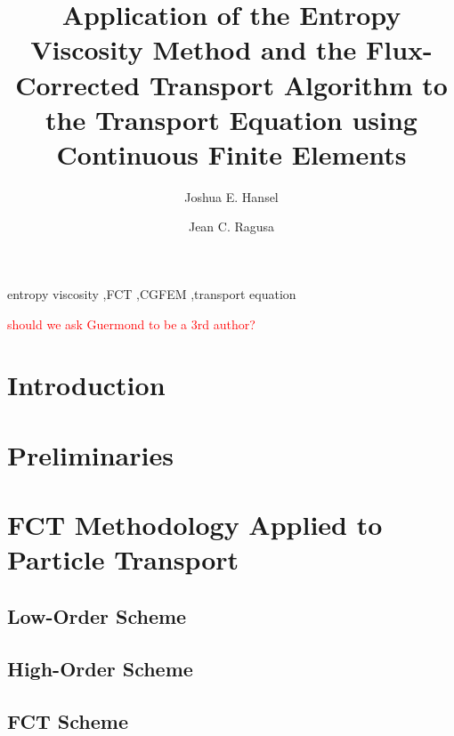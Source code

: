 \documentclass{elsarticle}
\newcommand{\tcr}[1]{\textcolor{red}{#1}}
\begin{document}
\begin{frontmatter}


\title{Application of the Entropy Viscosity Method and the Flux-Corrected Transport
  Algorithm to the Transport Equation using Continuous Finite Elements}

\author[tamu]{Joshua E. Hansel}

\author[tamu]{Jean C. Ragusa}

\address[tamu]{Texas A\&M University,
  400 Bizzell St,
  College Station, TX 77840}



\begin{keyword}
entropy viscosity \sep FCT \sep CGFEM \sep transport equation
\end{keyword}

\end{frontmatter}
\tcr{should we ask Guermond to be a 3rd author?}

\section{Introduction\label{sec:introduction}}


\section{Preliminaries\label{sec:preliminaries}}


\section{FCT Methodology Applied to Particle Transport\label{sec:methodology}}

\subsection{Low-Order Scheme\label{sec:low}}

\subsection{High-Order Scheme\label{sec:high}}

\subsection{FCT Scheme\label{sec:fct}}

\end{document}
